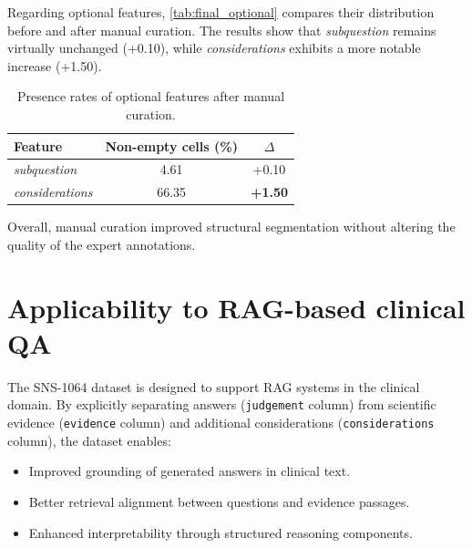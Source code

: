 \documentclass[11pt,a4paper]{article}
\begin{document}
Regarding optional features, \autoref{tab:final_optional} compares their distribution before and after manual curation. The results show that \textit{subquestion} remains virtually unchanged (+0.10), while \textit{considerations} exhibits a more notable increase (+1.50). 

\begin{table}[H]
\centering
\begin{tabular}{lcc}
\toprule
\textbf{Feature} & \textbf{Non-empty cells (\%)} & $\Delta$  \\
\midrule
\textit{subquestion} & 4.61 & +0.10 \\
\textit{considerations} & 66.35 & \textbf{+1.50} \\
\bottomrule
\end{tabular}
\caption{Presence rates of optional features after manual curation.}
\label{tab:final_optional}
\end{table}

Overall, manual curation improved structural segmentation without altering the quality of the expert annotations.



\section{Applicability to RAG-based clinical QA}

The SNS-1064 dataset is designed to support RAG systems in the clinical domain. By explicitly separating answers (\fontsize{10pt}{11pt}\texttt{judgement} \normalsize column) from scientific evidence (\fontsize{10pt}{11pt}\texttt{evidence} \normalsize column) and additional considerations (\fontsize{10pt}{11pt}\texttt{considerations} \normalsize column), the dataset enables:

\begin{itemize}
    \item Improved grounding of generated answers in clinical text.
    \item Better retrieval alignment between questions and evidence passages.
    \item Enhanced interpretability through structured reasoning components.
\end{itemize}
\end{document}
